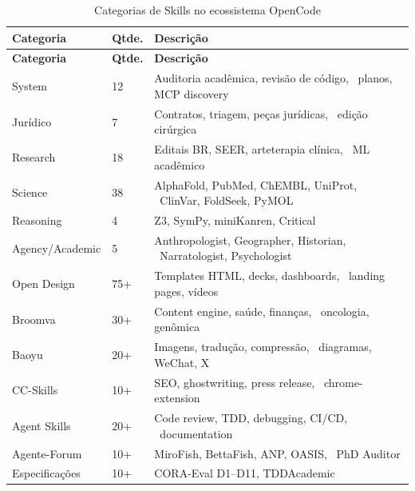 \documentclass[
  brazil,
  sumario=tradicional,
  10pt
]{abntex2}
\begin{document}
\begin{longtable}{p{3cm}p{2cm}p{7cm}}
  \caption{Categorias de Skills no ecossistema OpenCode}
  \label{tab:skills}\\
  \toprule
  \textbf{Categoria} & \textbf{Qtde.} & \textbf{Descrição} \\
  \midrule
  \endfirsthead
  \toprule
  \textbf{Categoria} & \textbf{Qtde.} & \textbf{Descrição} \\
  \midrule
  \endhead
  \bottomrule
  \endfoot
  System              & 12   & Auditoria acadêmica, revisão de código, \
                                      planos, MCP discovery \\
  Jurídico            & 7    & Contratos, triagem, peças jurídicas, \
                                      edição cirúrgica \\
  Research            & 18   & Editais BR, SEER, arteterapia clínica, \
                                      ML acadêmico \\
  Science             & 38   & AlphaFold, PubMed, ChEMBL, UniProt, \
                                      ClinVar, FoldSeek, PyMOL \\
  Reasoning           & 4    & Z3, SymPy, miniKanren, Critical \\
  Agency/Academic     & 5    & Anthropologist, Geographer, Historian, \
                                      Narratologist, Psychologist \\
  Open Design         & 75+  & Templates HTML, decks, dashboards, \
                                      landing pages, vídeos \\
  Broomva             & 30+  & Content engine, saúde, finanças, \
                                      oncologia, genômica \\
  Baoyu               & 20+  & Imagens, tradução, compressão, \
                                      diagramas, WeChat, X \\
  CC-Skills           & 10+  & SEO, ghostwriting, press release, \
                                      chrome-extension \\
  Agent Skills        & 20+  & Code review, TDD, debugging, CI/CD, \
                                      documentation \\
  Agente-Forum        & 10+  & MiroFish, BettaFish, ANP, OASIS, \
                                      PhD Auditor \\
  Especificações      & 10+  & CORA-Eval D1--D11, TDDAcademic \\
\end{longtable}
\end{document}
